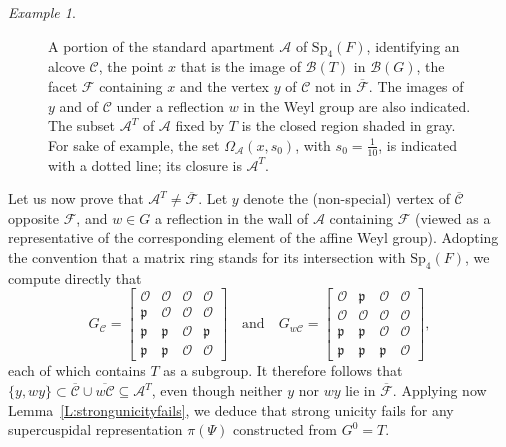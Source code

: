 \documentclass[12pt]{amsart}
\newcommand{\R}{{\scriptstyle{\mathcal{O}}}}
\newcommand{\PP}{\mathfrak{p}}
\newcommand{\ratk}{F}
\newcommand{\Sp}{\mathrm{Sp}}
\newcommand{\apart}{{\mathcal{A}}}
\newcommand{\Aset}{\Omega_{\apart}}
\newcommand{\buil}{\mathcal{B}}
\newcommand{\C}{\mathcal{C}} %
\newcommand{\F}{\mathcal{F}} %
\newcommand{\bmat}[1]{\begin{bmatrix} #1 \end{bmatrix}}
\theoremstyle{plain}
\theoremstyle{definition}
\theoremstyle{remark}
\newtheorem{egr}[theorem]{Example}
\newenvironment{example}{\begin{egr}}{\qedsymbol \end{egr}}
\numberwithin{equation}{section}
\numberwithin{figure}{section}
\begin{document}
\begin{example}
\begin{figure}[ht]
\caption{A portion of the standard apartment $\apart$ of $\Sp_4(\ratk)$, identifying an alcove $\mathcal{C}$, the point $x$ that is the image of $\buil(T)$ in $\buil(G)$, the facet $\F$ containing $x$ and the vertex $y$ of $\C$ not in $\overline{\F}$.  The images of $y$ and of $\C$ under a reflection $w$ in the Weyl group are also indicated.  The subset $\apart^T$ of $\apart$ fixed by $T$ is the closed region shaded in gray.  For sake of example, the set $\Aset(x,s_0)$, with $s_0=\frac{1}{10}$, is indicated with a dotted line; its closure is $\apart^T$.}
\label{Fig:1}
\end{figure}

Let us now prove that $\apart^T \neq \overline{\F}$.  Let $y$ denote the (non-special) vertex of $\overline{\C}$ opposite $\F$, and $w\in G$ a reflection in the wall of $\apart$ containing $\F$ (viewed as a representative of the corresponding element of the affine Weyl group).  Adopting the convention that a matrix ring stands for its intersection with $\Sp_4(\ratk)$, we compute directly that
\begin{equation}\label{E:GCGy}
G_{\C} = \bmat{\R & \R & \R & \R \\ \PP  & \R & \R&\R \\ \PP &\PP & \R&\PP\\ \PP&\PP&\R&\R}
\quad \text{and} \quad
G_{w\C} = 
\bmat{\R & \PP & \R & \R \\ 
\R  & \R & \R&\R \\ 
\PP &\PP & \R&\R\\ 
\PP&\PP&\PP&\R},
\end{equation}
each of which contains $T$ as a subgroup.  It therefore follows that $\{y,wy\} \subset \overline{\C}\cup \overline{w\C}\subseteq \apart^T$, even though neither $y$ nor $wy$ lie in $\overline{\F}$.
Applying now Lemma~\ref{L:strongunicityfails}, we deduce that strong unicity fails for any supercuspidal representation $\pi(\Psi)$ constructed from $G^0=T$.
\end{example}
\end{document}
